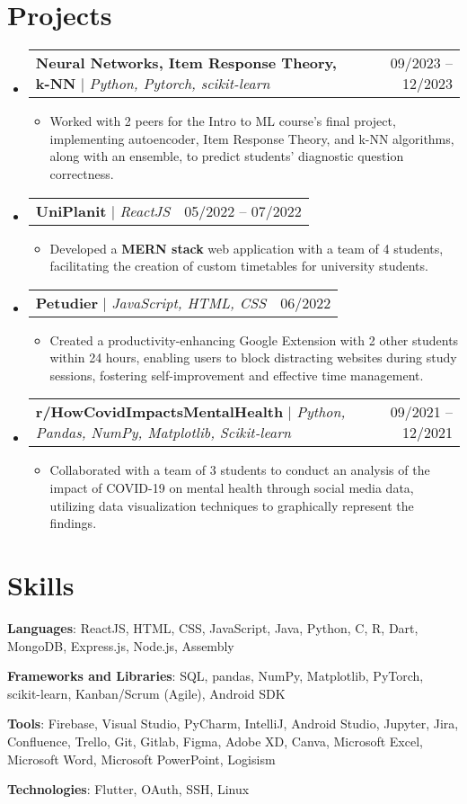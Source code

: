 \documentclass[letterpaper,11pt]{article}
\makeatletter
\newcommand{\resumeItem}[1]{
  \item\small{
    {#1 \vspace{-2pt}}
  }
}
\newcommand{\resumeProjectHeading}[2]{
    \item
    \begin{tabular*}{0.97\textwidth}{l@{\extracolsep{\fill}}r}
      \small#1 & #2 \\
    \end{tabular*}\vspace{-7pt}
}
\newcommand{\resumeSubHeadingListStart}{\begin{itemize}[leftmargin=0.15in, label={}]}
\newcommand{\resumeSubHeadingListEnd}{\end{itemize}}
\newcommand{\resumeItemListStart}{\begin{itemize}}
\newcommand{\resumeItemListEnd}{\end{itemize}\vspace{-5pt}}
\makeatother
\begin{document}
\section{Projects}
    \resumeSubHeadingListStart
        \resumeProjectHeading
          {\textbf{Neural Networks, Item Response Theory, k-NN} $|$ \emph{Python, Pytorch, scikit-learn}}{09/2023 -- 12/2023}
          \resumeItemListStart
            \resumeItem{Worked with 2 peers for the Intro to ML course's final project, implementing autoencoder, Item Response Theory, and k-NN algorithms, along with an ensemble, to predict students’ diagnostic question correctness.}
          \resumeItemListEnd
      \resumeProjectHeading
          {\textbf{UniPlanit} $|$ \emph{ReactJS}}{05/2022 -- 07/2022}
          \resumeItemListStart
            \resumeItem{Developed a \textbf{MERN stack} web application with a team of 4 students, facilitating the creation of custom timetables for university students.}
          \resumeItemListEnd
      \resumeProjectHeading
          {\textbf{Petudier} $|$ \emph{JavaScript, HTML, CSS}}{06/2022}
          \resumeItemListStart
            \resumeItem{Created a productivity-enhancing Google Extension with 2 other students within 24 hours, enabling users to block distracting websites during study sessions, fostering self-improvement and effective time management.}
          \resumeItemListEnd
        \resumeProjectHeading   {\textbf{r/HowCovidImpactsMentalHealth} $|$ \emph{Python, Pandas, NumPy, Matplotlib, Scikit-learn}}{09/2021 -- 12/2021}
          \resumeItemListStart
            \resumeItem{Collaborated with a team of 3 students to conduct an analysis of the impact of COVID-19 on mental health through social media data, utilizing data visualization techniques to graphically represent the findings.}
          \resumeItemListEnd
    \resumeSubHeadingListEnd



%
\section{Skills}
 \begin{itemize}[leftmargin=0.15in, label={}]
    \small{
    \item{
     \textbf{Languages}{: ReactJS, HTML, CSS, JavaScript, Java, Python, C, R, Dart, MongoDB, Express.js, Node.js, Assembly} \\
    }
    \item{
     \textbf{Frameworks and Libraries}{: SQL, pandas, NumPy, Matplotlib, PyTorch, scikit-learn, Kanban/Scrum (Agile), Android SDK} \\
    }
    \item{
     \textbf{Tools}{: Firebase, Visual Studio, PyCharm, IntelliJ, Android Studio, Jupyter, Jira, Confluence, Trello, Git, Gitlab, Figma, Adobe XD, Canva, Microsoft Excel, Microsoft Word, Microsoft PowerPoint, Logisism} \\
    }
    \item{
     \textbf{Technologies}{: Flutter, OAuth, SSH, Linux} \\
    }
    
    }
 \end{itemize}


\end{document}
